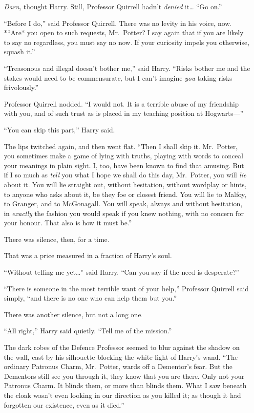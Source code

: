 \emph{Darn,} thought Harry. Still, Professor Quirrell hadn't
\emph{denied} it\ldots{} ``Go on.''

``Before I do,'' said Professor Quirrell. There was no levity in his
voice, now. *``Are* you open to such requests, Mr.~Potter? I say again
that if you are likely to say no regardless, you must say no now. If
your curiosity impels you otherwise, squash it.''

``Treasonous and illegal doesn't bother me,'' said Harry. ``Risks bother
me and the stakes would need to be commensurate, but I can't imagine
\emph{you} taking risks frivolously.''

Professor Quirrell nodded. ``I would not. It is a terrible abuse of my
friendship with you, and of such trust as is placed in my teaching
position at Hogwarts---''

``You can skip this part,'' Harry said.

The lips twitched again, and then went flat. ``Then I shall skip it.
Mr.~Potter, you sometimes make a game of lying with truths, playing with
words to conceal your meanings in plain sight. I, too, have been known
to find that amusing. But if I so much as \emph{tell} you what I hope we
shall do this day, Mr.~Potter, you will \emph{lie} about it. You will
lie straight out, without hesitation, without wordplay or hints, to
anyone who asks about it, be they foe or closest friend. You will lie to
Malfoy, to Granger, and to McGonagall. You will speak, always and
without hesitation, in \emph{exactly} the fashion you would speak if you
knew nothing, with no concern for your honour. That also is how it must
be.''

There was silence, then, for a time.

That was a price measured in a fraction of Harry's soul.

``Without telling me yet\ldots{}'' said Harry. ``Can you say if the need
is desperate?''

``There is someone in the most terrible want of your help,'' Professor
Quirrell said simply, ``and there is no one who can help them but you.''

There was another silence, but not a long one.

``All right,'' Harry said quietly. ``Tell me of the mission.''

The dark robes of the Defence Professor seemed to blur against the
shadow on the wall, cast by his silhouette blocking the white light of
Harry's wand. ``The ordinary Patronus Charm, Mr.~Potter, wards off a
Dementor's fear. But the Dementors still see you through it, they know
that you are there. Only not your Patronus Charm. It blinds them, or
more than blinds them. What I saw beneath the cloak wasn't even looking
in our direction as you killed it; as though it had forgotten our
existence, even as it died.''

